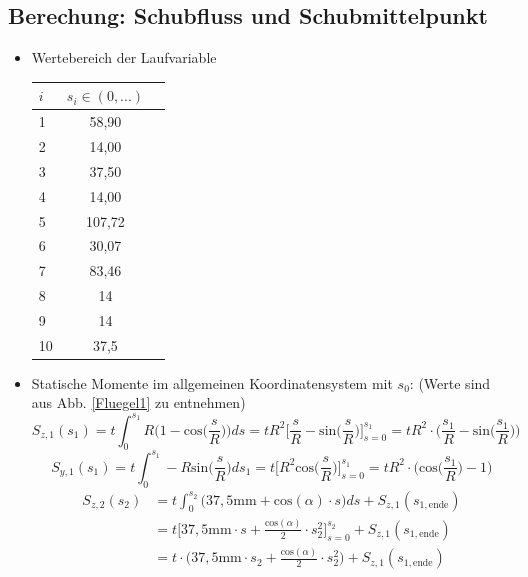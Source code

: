 \subsection{Berechung: Schubfluss und Schubmittelpunkt}
\begin{itemize}
	\item Wertebereich der Laufvariable
	\begin{center}
		\begin{tabular}[h]{l|c|c}
			$i$&$s_i\in(0,...)$\\
			\hline
			1&58,90\\
			2&14,00\\
			3&37,50\\
			4&14,00\\
			5&107,72\\
			6&30,07\\
			7&83,46\\
			8&14\\
			9&14\\
			10&37,5\\
		\end{tabular}
	\end{center}
	\item Statische Momente im allgemeinen Koordinatensystem mit $s_0$: (Werte sind aus Abb. \ref{Fluegel1} zu entnehmen)
	\begin{equation}
		S_{z,1}(s_1) = t\int_{0}^{s_1} R\bigg(1-\mathrm{cos}\bigg(\frac{s}{R}\bigg)\bigg)ds = tR^2\bigg[\frac{s}{R} - \mathrm{sin}\bigg(\frac{s}{R}\bigg)\bigg]_{s=0}^{s_1} = tR^2\cdot\bigg(\frac{s_1}{R}-\mathrm{sin}\bigg(\frac{s_1}{R}\bigg)\bigg)
	\end{equation}
	\begin{equation}
		S_{y,1}(s_1) = t\int_{0}^{s_1} -R\mathrm{sin}\bigg(\frac{s}{R}\bigg)ds_1 = t\biggl[ R^2 \mathrm{cos}\bigg(\frac{s}{R}\bigg)\biggr]^{s_1}_{s=0} = tR^2 \cdot\bigg(\mathrm{cos}\bigg(\frac{s_1}{R}\bigg)-1\bigg)
	\end{equation}
\begin{equation}
	\begin{split}
		S_{z,2}(s_2) &= t\int_{0}^{s_2}\bigg(37,5\mathrm{mm}+\mathrm{cos}(\alpha)\cdot s\bigg)ds + S_{z,1}(s_{1,\mathrm{ende}}) \\\
		&= t\bigg[37,5\mathrm{mm}\cdot s +\frac{\mathrm{cos}(\alpha)}{2}\cdot s^2_2\bigg]_{s=0}^{s_2} + S_{z,1}(s_{1,\mathrm{ende}}) \\\ 
		&= t\cdot\bigg(37,5\mathrm{mm}\cdot s_2 +\frac{\mathrm{cos}(\alpha)}{2}\cdot s^2_2\bigg) + S_{z,1}(s_{1,\mathrm{ende}})
	\end{split}

\end{equation}
\end{itemize}
